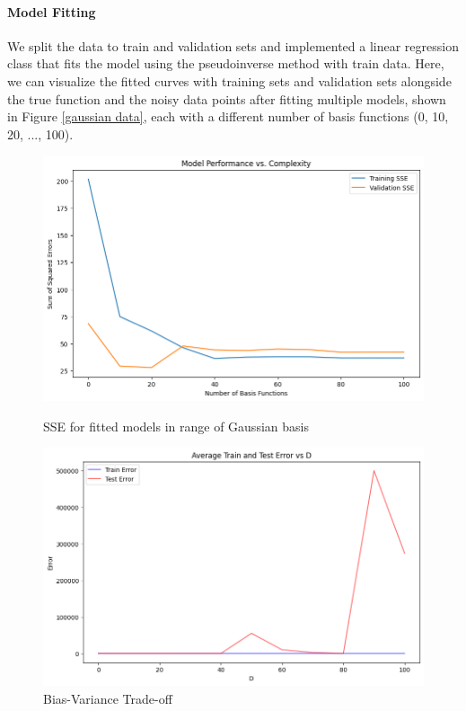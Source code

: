 \documentclass{article}
\begin{document}
\paragraph{Model Fitting}
We split the data to train and validation sets and implemented a linear regression class that fits the model using the pseudoinverse method with train data. Here, we can visualize the fitted curves with training sets and validation sets alongside the true function and the noisy data points after fitting multiple models, shown in Figure \ref{gaussian data}, each with a different number of basis functions (0, 10, 20, ..., 100).
\begin{figure}[H]
    \centering
    \begin{minipage}{0.45\textwidth}
        \centering
        \includegraphics[width=\linewidth, height=0.45\linewidth]{figures/complexity.png} 
        \caption{SSE for fitted models in range of Gaussian basis}
        \label{SSE}
    \end{minipage}
    \centering
    \begin{minipage}{0.50\textwidth}
        \centering
        \includegraphics[width=\linewidth, height=0.45\linewidth]{figures/average_error.png} 
        \caption{Bias-Variance Trade-off}
        \label{error_compare}
    \end{minipage}
\end{figure}
\end{document}

